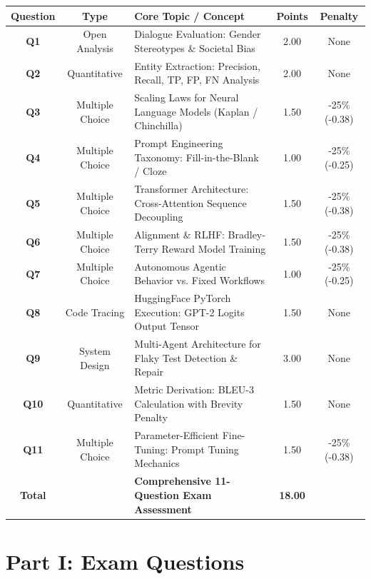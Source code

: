 \documentclass[11pt,a4paper]{article}
\begin{document}
\begin{center}
\small
\begin{tabularx}{\linewidth}{c c X c c}
\toprule
\textbf{Question} & \textbf{Type} & \textbf{Core Topic / Concept} & \textbf{Points} & \textbf{Penalty} \\
\midrule
\textbf{Q1} & Open Analysis & Dialogue Evaluation: Gender Stereotypes \& Societal Bias & 2.00 & None \\
\textbf{Q2} & Quantitative & Entity Extraction: Precision, Recall, TP, FP, FN Analysis & 2.00 & None \\
\textbf{Q3} & Multiple Choice & Scaling Laws for Neural Language Models (Kaplan / Chinchilla) & 1.50 & -25\% (-0.38) \\
\textbf{Q4} & Multiple Choice & Prompt Engineering Taxonomy: Fill-in-the-Blank / Cloze & 1.00 & -25\% (-0.25) \\
\textbf{Q5} & Multiple Choice & Transformer Architecture: Cross-Attention Sequence Decoupling & 1.50 & -25\% (-0.38) \\
\textbf{Q6} & Multiple Choice & Alignment \& RLHF: Bradley-Terry Reward Model Training & 1.50 & -25\% (-0.38) \\
\textbf{Q7} & Multiple Choice & Autonomous Agentic Behavior vs. Fixed Workflows & 1.00 & -25\% (-0.25) \\
\textbf{Q8} & Code Tracing & HuggingFace PyTorch Execution: GPT-2 Logits Output Tensor & 1.50 & None \\
\textbf{Q9} & System Design & Multi-Agent Architecture for Flaky Test Detection \& Repair & 3.00 & None \\
\textbf{Q10} & Quantitative & Metric Derivation: BLEU-3 Calculation with Brevity Penalty & 1.50 & None \\
\textbf{Q11} & Multiple Choice & Parameter-Efficient Fine-Tuning: Prompt Tuning Mechanics & 1.50 & -25\% (-0.38) \\
\midrule
\textbf{Total} & & \textbf{Comprehensive 11-Question Exam Assessment} & \textbf{18.00} & \\
\bottomrule
\end{tabularx}
\end{center}

\newpage

\section{Part I: Exam Questions}
\end{document}
